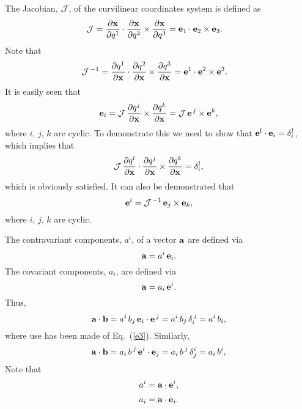 \documentclass[12pt,prb,aps,notitlepage]{revtex4-1}
\begin{document}
The Jacobian, ${\cal J}$,  of the curvilinear coordinates system is defined as
\begin{align}
{\cal J} &= \frac{\partial{\bf x}}{\partial q^1}\cdot\frac{\partial {\bf x}}{\partial q^2}\times\frac{\partial{\bf x}}{\partial q^3}={\bf e}_1\cdot{\bf e}_2\times{\bf e}_3.
\end{align}
Note that
\begin{align}
{\cal J}^{\,-1} &= \frac{\partial q^1}{\partial {\bf x}}\cdot\frac{\partial q^2}{\partial{\bf x}}\times\frac{\partial q^3}{\partial{\bf x}}= {\bf e}^1\cdot{\bf e}^2\times{\bf e}^3.
\end{align}
It is easily seen that
\begin{equation}\label{e5}
{\bf e}_i = {\cal J}\,\frac{\partial q^j}{\partial {\bf x}}\times \frac{\partial{q^k}}{\partial{\bf x}}= {\cal J}\,{\bf e}^{\,j}\times{\bf e}^k,
\end{equation}
where $i$, $j$, $k$ are cyclic. To demonstrate this we need to show that ${\bf e}^l\cdot{\bf e}_i= \delta_i^l$, 
which implies that 
\begin{equation}
 {\cal J}\,\frac{\partial q^l}{\partial {\bf x}}\cdot\frac{\partial q^j}{\partial {\bf x}}\times \frac{\partial{q^k}}{\partial{\bf x}}= \delta_i^l,
 \end{equation}
 which is obviously satisfied. It can also be demonstrated that
 \begin{equation}
 {\bf e}^i = {\cal J}^{\,-1}\,{\bf e}_j\times{\bf e}_k,
 \end{equation}
 where $i$, $j$, $k$ are cyclic. 
 
 The contravariant components, $a^i$,  of a vector ${\bf a}$ are defined via
 \begin{equation}
 {\bf a} = a^i\,{\bf e}_i.
 \end{equation}
 The covariant components, $a_i$, are defined via
 \begin{equation}
  {\bf a} = a_i\,{\bf e}^i.
  \end{equation}
  Thus,
  \begin{equation}
  {\bf a}\cdot{\bf b} = a^i\,b_j\,{\bf e}_i\cdot{\bf e}^{\,j} = a^i\,b_j\,\delta_i^{\,j} = a^i\,b_i,
  \end{equation}
  where use has been made of Eq.~(\ref{e3}). 
  Similarly, 
  \begin{equation}
  {\bf a}\cdot{\bf b} = a_i\,b^{\,j}\,{\bf e}^i\cdot{\bf e}_j = a_i\,b^{\,j}\,\delta^i_j = a_i\,b^i,
  \end{equation}
  Note that
  \begin{align}
  a^i &= {\bf a}\cdot{\bf e}^i,\\[0.5ex]
  a_i &= {\bf a}\cdot{\bf e}_i.
    \end{align}
    
\end{document}
